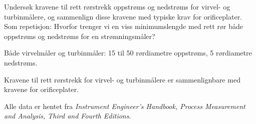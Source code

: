 

Undersøk kravene til rett rørstrekk oppstrøms og nedstrøms for virvel- og turbinmålere, og sammenlign disse kravene med typiske krav for orificeplater. Som repetisjon: Hvorfor trenger vi en viss minimumslengde med rett rør både oppstrøms og nedstrøms for en strømningsmåler?







Både virvelmåler og turbinmåler: 15 til 50 rørdiametre oppstrøms, 5 rørdiametre nedstrøms.







Kravene til rett rørstrekk for virvel- og turbinmålere er sammenlignbare med kravene for orificeplater.

Alle data er hentet fra {\it Instrument Engineer's Handbook, Process Measurement and Analysis, Third and Fourth Editions}.



